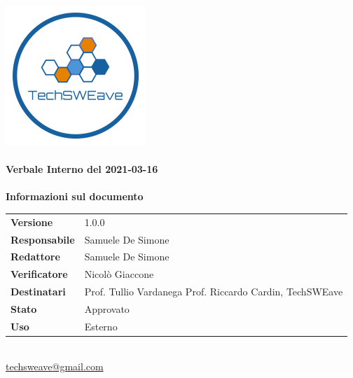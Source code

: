 \documentclass[a4paper]{article}
\begin{document}
\begin{titlepage}
    \begin{center}
        \includegraphics{../../../../Images/logo}\\
        \vspace{20px}
        \textcolor{logo}{\hrulefill}\\
        \vspace{20px}
        \textbf{\huge\textcolor{logo}{Verbale Interno del 2021-03-16}}\\
        \vspace{10px}
        \textcolor{logo}{\hrulefill}\\
        \vspace{40px}
        \textbf{\Large Informazioni sul documento}\\
        \vspace{20px}
        \begin{tabular}{p{100px} | p{100px}}
            \textbf{Versione} & 1.0.0\\
            \textbf{Responsabile} & Samuele De Simone\\
            \textbf{Redattore} & Samuele De Simone\\
            \textbf{Verificatore} & Nicolò Giaccone\\
            \textbf{Destinatari} & Prof. Tullio Vardanega \newline Prof. Riccardo Cardin, \newline TechSWEave\\
            \textbf{Stato} & Approvato\\
            \textbf{Uso} & Esterno\\
        \end{tabular}\\
        \vspace{60px}
        \href{mailto:techsweave@gmail.com}{techsweave@gmail.com}\\

    \end{center}
    \end{titlepage}
\end{document}
